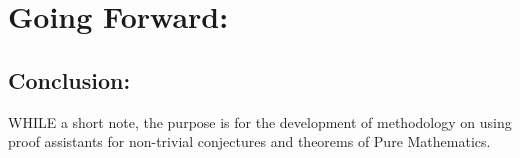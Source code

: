 \documentclass[10pt]{article}
\theoremstyle{plain}
\theoremstyle{definition}
\theoremstyle{remark}
\begin{document}
	\section{Going Forward:}
	\subsection{Conclusion:}
	\lettrine[lines=1, lhang=0.1, loversize=0.2]{W}HILE a short note, the purpose is for the development of methodology on using proof assistants for non-trivial conjectures and theorems of Pure Mathematics.
	
\nocite{*}
	


	
	
\end{document}
